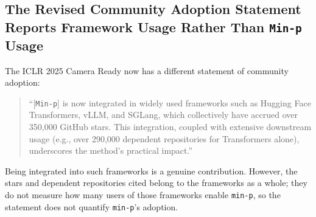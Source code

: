 \subsection{The Revised Community Adoption Statement Reports Framework Usage Rather Than \texttt{Min-p} Usage}

The ICLR 2025 Camera Ready now has a different statement of community adoption:
%
\begin{quote}
    ``[\texttt{Min-p}] is now integrated in widely used frameworks such as Hugging Face Transformers, vLLM, and SGLang, which collectively have accrued over 350,000 GitHub stars. This integration, coupled with extensive downstream usage (e.g., over 290,000 dependent repositories for Transformers alone), underscores the method’s practical impact.''
\end{quote}

Being integrated into such frameworks is a genuine contribution. However, the stars and dependent repositories cited belong to the frameworks as a whole; they do not measure how many users of those frameworks enable \texttt{min-p}, so the statement does not quantify \texttt{min-p}'s adoption.
